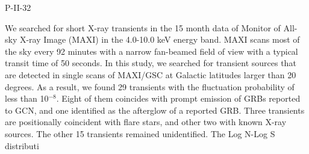 P-II-32


\bigskip



\bigskip

\noindent We searched for short X-ray transients in the 15 month data of Monitor of All-sky X-ray Image (MAXI) in the 4.0-10.0 keV energy band.  MAXI scans most of the sky every 92 minutes with a narrow fan-beamed field of view with a typical transit time of 50 seconds.  In this study, we searched for transient sources that are detected in single scans of MAXI/GSC at Galactic latitudes larger than 20 degrees.  As a result, we found 29 transients with the fluctuation probability of less than 10$^{-8}$.
Eight of them coincides with prompt emission of GRBs reported to GCN, and one identified as the afterglow of a reported GRB.
Three transients are positionally coincident with flare stars, and other two with known X-ray sources.  
The other 15 transients remained unidentified.
The Log N-Log S distributi

